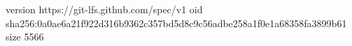 version https://git-lfs.github.com/spec/v1
oid sha256:0a0ae6a21f922d316b9362c357bd5d8c9c56adbe258a1f0e1a68358fa3899b61
size 5566
